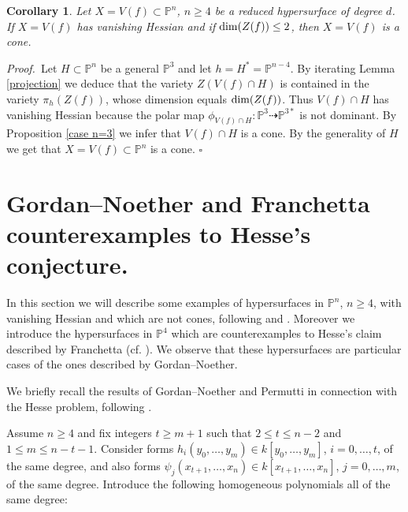 \documentclass[11pt,a4paper]{amsart}
\newtheorem{cor}[theorem]{Corollary}
\newcommand{\bprf}{{\it Proof.~}}
\newcommand{\erem}{\hfill $\square$}
\begin{document}
\begin{cor}\label{Xcone}
Let $X=V(f)\subset\mathbb{P}^n$, $n\geq 4$ be a reduced hypersurface of degree $d$. If $X=V(f)$ has vanishing Hessian and if ${\rm dim}(Z(f))\leq 2$, then $X=V(f)$ is a cone.
\end{cor}
\bprf Let $H\subset\mathbb{P}^n$ be a general $\mathbb{P}^3$ and
let $h=H^*=\mathbb{P}^{n-4}$. By iterating Lemma \ref{projection}
we deduce that the variety $Z(V(f)\cap H)$ is contained in the
variety   $\pi_h(Z(f))$, whose dimension equals ${\rm dim}(Z(f))$.
Thus  $V(f)\cap H$ has vanishing Hessian because the polar map
$\phi_{V(f)\cap
H}\colon\mathbb{P}^3\dashrightarrow\mathbb{P}^{3*}$ is not
dominant. By Proposition \ref{case n=3} we infer that $V(f)\cap H$
is a cone. By the generality of $H$ we get that
$X=V(f)\subset\mathbb{P}^n$ is a cone. \erem

\section{Gordan--Noether and Franchetta counterexamples to Hesse's conjecture.}
In this section we will describe some examples of hypersurfaces in
$\mathbb{P}^n$, $n\geq 4$, with vanishing Hessian and which are
not cones, following \cite{Gordan Noether} and
\cite[$\S$2]{CilibertoRussoSimis}. Moreover we introduce the
hypersurfaces in $\mathbb{P}^4$ which are counterexamples to
Hesse's claim described by Franchetta (cf. \cite{Franchetta}). We
observe that these hypersurfaces are particular cases of the ones
described by Gordan--Noether.

We briefly recall the results of Gordan--Noether and Permutti in
connection with the Hesse problem, following \cite{CilibertoRussoSimis}.

Assume $n\geq 4$ and fix integers $t\geq m+1$ such that $2\leq
t\leq n-2$ and $1\leq m\leq n-t-1$. Consider forms $h_i(y_0,
\ldots ,y_m)\in k[y_0, \ldots ,y_m]$, $i=0,\ldots ,t$, of the same
degree, and also forms $\psi_j(x_{t+1}, \ldots ,x_n)\in k[x_{t+1},
\ldots ,x_n]$, $j=0,\ldots ,m$, of the  same degree. Introduce the
following homogeneous polynomials all of the same degree:
\end{document}
